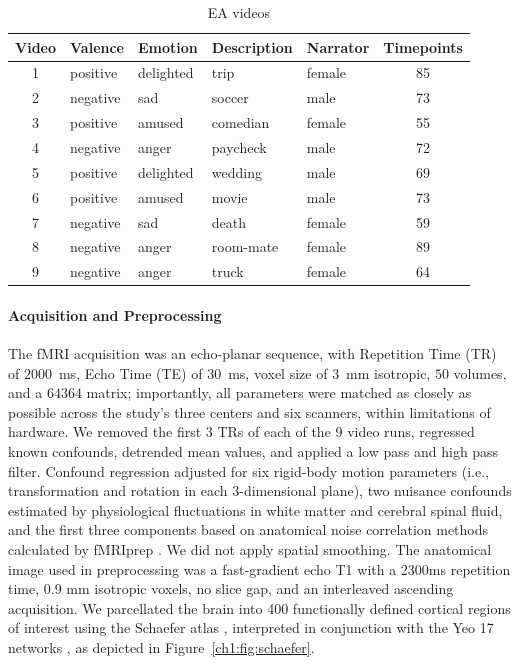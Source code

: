 \begin{table}[h]
  \caption{EA videos}
  \label{ch1:tab:ea}
    \centering
    \begin{tabular}{c l l l l c}
        \toprule
        \cmidrule(r){1-2}
        Video & Valence &	Emotion &	Description &	Narrator &	Timepoints \\ 
        \midrule
        1 & positive &	delighted &	trip &	female &	85 \\
        2 & negative &	sad &	soccer &	male &	73 \\
        3 & positive &	amused &	comedian &	female &	55 \\
        4 & negative &	anger &	paycheck &	male &	72 \\
        5 & positive &	delighted &	wedding &	male &	69 \\
        6 & positive &	amused &	movie &	male &	73 \\
        7 & negative &	sad &	death &	female &	59 \\
        8 & negative &	anger &	room-mate &	female &	89 \\
        9 & negative &	anger &	truck &	female &	64 \\
        \bottomrule
    \end{tabular}
\end{table}

\paragraph{Acquisition and Preprocessing}
The fMRI acquisition was an echo-planar sequence, with Repetition Time (TR) of $2000$~ms, Echo Time (TE) of $30$~ms, voxel size of $3$~mm isotropic, $50$ volumes, and a $64364$ matrix; importantly, all parameters were matched as closely as possible across the study’s three centers and six scanners, within limitations of hardware. We removed the first 3 TRs of each of the 9 video runs, regressed known confounds, detrended mean values, and applied a low pass and high pass filter. Confound regression adjusted for six rigid-body motion parameters (i.e., transformation and rotation in each 3-dimensional plane), two nuisance confounds estimated by physiological fluctuations in white matter and cerebral spinal fluid, and the first three components based on anatomical noise correlation methods calculated by fMRIprep \cite{fmriprep}. We did not apply spatial smoothing. The anatomical image used in preprocessing was a fast-gradient echo T1 with a 2300ms repetition time, 0.9 mm isotropic voxels, no slice gap, and an interleaved ascending acquisition. We parcellated the brain into 400 functionally defined cortical regions of interest using the Schaefer atlas \cite{schaefer2018local}, interpreted in conjunction with the Yeo 17 networks \cite{yeo}, as depicted in Figure~\ref{ch1:fig:schaefer}.

